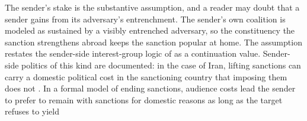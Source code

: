  The sender's stake is the substantive
assumption, and a reader may doubt that a sender gains from its adversary's
entrenchment. The sender's own coalition is modeled as sustained by a visibly
entrenched adversary, so the constituency the sanction strengthens abroad keeps
the sanction popular at home. The assumption restates the sender-side
interest-group logic of \citet{Kaempfer1988} as a continuation value. Sender-side politics of this kind are
documented: in the case of Iran,
lifting sanctions can carry a domestic political cost in the sanctioning country
that imposing them does not \citep[p.~118]{BajoghliNasrSalehiIsfahaniVaez2024}.
In a formal model of ending sanctions, audience costs lead the sender to prefer to
remain with sanctions for domestic reasons as long as the target refuses to yield
